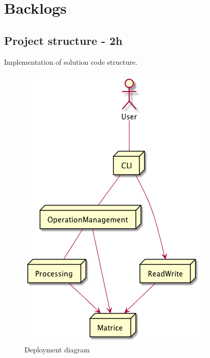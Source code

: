 \chapter{Backlogs}

\section{Project structure - 2h}
Implementation of solution code structure.

\begin{figure}[h]
    \begin{center}
        \includegraphics[scale=0.40]{./ressources/graph/deployment.png}
    \end{center}
    \caption{Deployment diagram}
    \label{Solution - Deployment diagram}
\end{figure}
\bigskip


